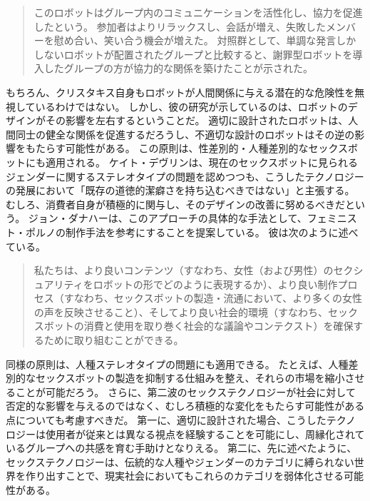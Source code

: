 \documentclass[paper=a4,book,openany]{jlreq}
\begin{document}
\begin{quote}
このロボットはグループ内のコミュニケーションを活性化し、協力を促進したという。
参加者はよりリラックスし、会話が増え、失敗したメンバーを慰め合い、笑い合う機会が増えた。
対照群として、単調な発言しかしないロボットが配置されたグループと比較すると、謝罪型ロボットを導入したグループの方が協力的な関係を築けたことが示された。
\citep{christakis19:_how_ai_will_rewir_us}
\end{quote}

もちろん、クリスタキス自身もロボットが人間関係に与える潜在的な危険性を無視しているわけではない。
しかし、彼の研究が示しているのは、ロボットのデザインがその影響を左右するということだ。
適切に設計されたロボットは、人間同士の健全な関係を促進するだろうし、不適切な設計のロボットはその逆の影響をもたらす可能性がある。
この原則は、性差別的・人種差別的なセックスボットにも適用される。
ケイト・デヴリンは、現在のセックスボットに見られるジェンダーに関するステレオタイプの問題を認めつつも、こうしたテクノロジーの発展において「既存の道徳的潔癖さを持ち込むべきではない」と主張する。
むしろ、消費者自身が積極的に関与し、そのデザインの改善に努めるべきだという\citep{devlin15:_in_defen_sex_machin}。
ジョン・ダナハーは、このアプローチの具体的な手法として、フェミニスト・ポルノの制作手法を参考にすることを提案している。
彼は次のように述べている。

\begin{quote}
私たちは、より良いコンテンツ（すなわち、女性（および男性）のセクシュアリティをロボットの形でどのように表現するか）、より良い制作プロセス（すなわち、セックスボットの製造・流通において、より多くの女性の声を反映させること）、そしてより良い社会的環境（すなわち、セックスボットの消費と使用を取り巻く社会的な議論やコンテクスト）を確保するために取り組むことができる。
\citep[p.143]{danaher19:_build_better_sex_robot}
\end{quote}

同様の原則は、人種ステレオタイプの問題にも適用できる。
たとえば、人種差別的なセックスボットの製造を抑制する仕組みを整え、それらの市場を縮小させることが可能だろう。
さらに、第二波のセックステクノロジーが社会に対して否定的な影響を与えるのではなく、むしろ積極的な変化をもたらす可能性がある点についても考慮すべきだ。
第一に、適切に設計された場合、こうしたテクノロジーは使用者が従来とは異なる視点を経験することを可能にし、周縁化されているグループへの共感を育む手助けとなりえる\citep{ramirez20:_can_techn_help_us_be_more_empat}。
第二に、先に述べたように、セックステクノロジーは、伝統的な人種やジェンダーのカテゴリに縛られない世界を作り出すことで、現実社会においてもこれらのカテゴリを弱体化させる可能性がある。
\end{document}
